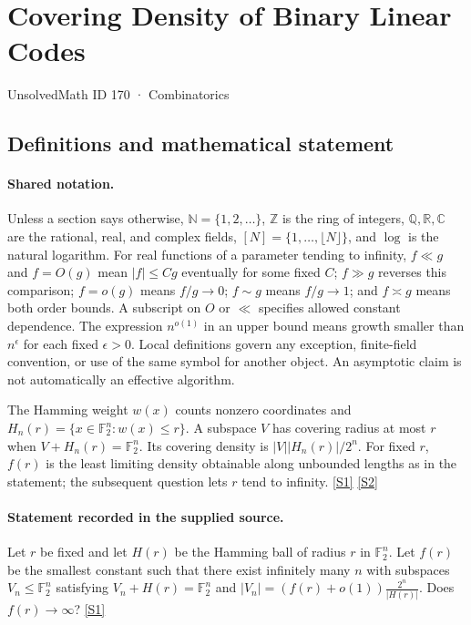 \documentclass[11pt,a4paper]{article}
\newcommand{\N}{\mathbb{N}}
\newcommand{\Z}{\mathbb{Z}}
\newcommand{\Q}{\mathbb{Q}}
\newcommand{\R}{\mathbb{R}}
\newcommand{\C}{\mathbb{C}}
\newcommand{\F}{\mathbb{F}}
\newcommand{\sref}[2]{\hyperlink{source:#1:#2}{[S#2]}}
\begin{document}

\setcounter{section}{169}

\section{Covering Density of Binary Linear Codes}\label{170}

{\small\sffamily UnsolvedMath ID 170 · Combinatorics}

\subsection{Definitions and mathematical statement}

\paragraph{Shared notation.}Unless a section says otherwise, $\N=\{1,2,\ldots\}$,
$\Z$ is the ring of integers, $\Q,\R,\C$ are the rational, real, and complex
fields, $[N]=\{1,\ldots,\lfloor N\rfloor\}$, and $\log$ is the natural
logarithm. For real functions of a parameter tending to infinity,
$f\ll g$ and $f=O(g)$ mean $|f|\leq Cg$ eventually for some fixed $C$;
$f\gg g$ reverses this comparison; $f=o(g)$ means $f/g\to0$;
$f\sim g$ means $f/g\to1$; and $f\asymp g$ means both order bounds.
A subscript on $O$ or $\ll$ specifies allowed constant dependence.
The expression $n^{o(1)}$ in an upper bound means growth smaller than
$n^\epsilon$ for each fixed $\epsilon>0$. Local definitions govern any
exception, finite-field convention, or use of the same symbol for another
object. An asymptotic claim is not automatically an effective algorithm.



The Hamming weight $w(x)$ counts nonzero coordinates and $H_n(r)=\{x\in\F_2^n:w(x)\leq r\}$. A subspace $V$ has covering radius at most $r$ when $V+H_n(r)=\F_2^n$. Its covering density is $|V||H_n(r)|/2^n$. For fixed $r$, $f(r)$ is the least limiting density obtainable along unbounded lengths as in the statement; the subsequent question lets $r$ tend to infinity. \sref{170}{1} \sref{170}{2}

\paragraph{Statement recorded in the supplied source.}
Let $r$ be fixed and let $H(r)$ be the Hamming ball of radius $r$ in $\mathbb{F}_2^n$. Let $f(r)$ be the smallest constant such that there exist infinitely many $n$ with subspaces $V_n \leq \mathbb{F}_2^n$ satisfying $V_n + H(r) = \mathbb{F}_2^n$ and $|V_n| = (f(r) + o(1)) \frac{2^n}{|H(r)|}$. Does $f(r) \to \infty$? \sref{170}{1}
\end{document}
